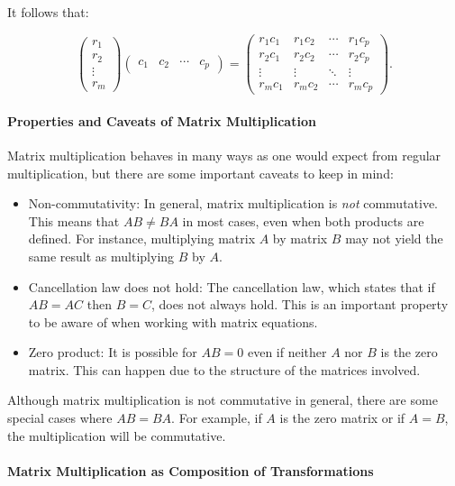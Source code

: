 \documentclass[a4paper,12pt]{article}
\begin{document}
It follows that:

\[
\begin{pmatrix}
r_1 \\
r_2 \\
\vdots \\
r_m
\end{pmatrix}
\begin{pmatrix}
c_1 & c_2 & \cdots & c_p
\end{pmatrix}
=
\begin{pmatrix}
r_1 c_1 & r_1 c_2 & \cdots & r_1 c_p \\
r_2 c_1 & r_2 c_2 & \cdots & r_2 c_p \\
\vdots & \vdots & \ddots & \vdots \\
r_m c_1 & r_m c_2 & \cdots & r_m c_p
\end{pmatrix}.
\]
\paragraph{Properties and Caveats of Matrix Multiplication}

Matrix multiplication behaves in many ways as one would expect from regular multiplication, but there are some important caveats to keep in mind:

\begin{itemize}
    \item Non-commutativity: In general, matrix multiplication is \textit{not} commutative. This means that \( AB \neq BA \) in most cases, even when both products are defined. For instance, multiplying matrix \( A \) by matrix \( B \) may not yield the same result as multiplying \( B \) by \( A \).
    \item Cancellation law does not hold: The cancellation law, which states that if \( AB = AC \) then \( B = C \), does not always hold. This is an important property to be aware of when working with matrix equations.
    \item Zero product: It is possible for \( AB = 0 \) even if neither \( A \) nor \( B \) is the zero matrix. This can happen due to the structure of the matrices involved.
\end{itemize}

Although matrix multiplication is not commutative in general, there are some special cases where \( AB = BA \). For example, if \( A \) is the zero matrix or if \( A = B \), the multiplication will be commutative.

\paragraph{Matrix Multiplication as Composition of Transformations}
\end{document}

